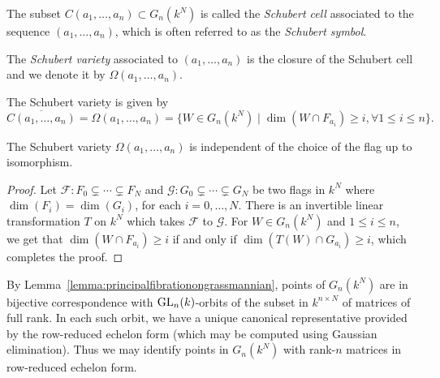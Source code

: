 \documentclass[a4paper,openany]{scrbook}
\begin{document}
\begin{defn}
The subset $C(a_1,\dots ,a_n)\subset G_n(k^N)$ is called the \textit{Schubert cell} associated to the sequence $(a_1,\dots ,a_n)$, which is often referred to as the \textit{Schubert symbol}. \par 
The \textit{Schubert variety} associated to $(a_1,\dots ,a_n)$ is the closure of the Schubert cell and we denote it by $\Omega(a_1,\dots ,a_n)$.
\end{defn}
The Schubert variety is given by 
\begin{equation*}
\overline{C(a_1,\dots ,a_n)} = \Omega(a_1,\dots ,a_n)=\lbrace W\in G_n(k^N) \mid \dim\left(W\cap F_{a_i}\right)\geq i, \forall 1\leq i\leq n \rbrace.
\end{equation*}
\begin{lemma}
The Schubert variety $\Omega(a_1,\dots , a_n)$ is independent of the choice of the flag up to isomorphism.
\end{lemma}
\begin{proof}
Let $\mathcal{F}:F_0\subsetneq \cdots \subsetneq F_N$ and $\mathcal{G}:G_0\subsetneq \cdots \subsetneq G_N$ be two flags in $k^N$ where $\dim(F_i)=\dim(G_i)$, for each $i=0,\dots ,N$. There is an invertible linear transformation $T$ on $k^N$ which takes $\mathcal{F}$ to $\mathcal{G}$. For $W\in G_n(k^N)$ and $1\leq i\leq n$, we get that  $\dim(W\cap F_{a_i})\geq i$ if and only if $\dim(T(W)\cap G_{a_i})\geq i$, which completes the proof.
\end{proof}


\begin{remark}\label{rem:echelonform}
By Lemma~\ref{lemma:principalfibrationongrassmannian}, points of $G_n(k^N)$ are in bijective correspondence with $\operatorname{GL}_n(k)$-orbits of the subset in $k^{n\times N}$ of matrices of full rank. In each  such orbit, we have a unique canonical representative provided by the row-reduced echelon form (which may be computed using Gaussian elimination). 
Thus we may identify points in $G_n(k^N)$ with rank-$n$ matrices in row-reduced echelon form.
\end{remark}
\end{document}
